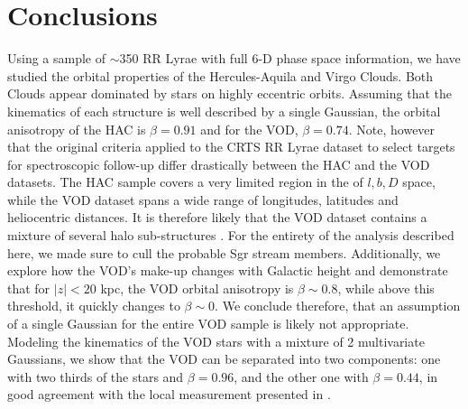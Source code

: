 \documentclass[fleqn,usenatbib]{mnras}
\begin{document}
\section{Conclusions}
%
Using a sample of $\sim$350 RR Lyrae with full 6-D phase space
information, we have studied the orbital properties of the
Hercules-Aquila and Virgo Clouds. Both Clouds appear dominated by
stars on highly eccentric orbits. Assuming that the kinematics of each
structure is well described by a single Gaussian, the orbital
anisotropy of the HAC is $\beta=0.91$ and for the VOD,
$\beta=0.74$. Note, however that the original criteria applied to the
CRTS RR Lyrae dataset to select targets for spectroscopic follow-up
differ drastically between the HAC and the VOD datasets. The HAC
sample covers a very limited region in the of $l,b, D$ space, while
the VOD dataset spans a wide range of longitudes, latitudes and
heliocentric distances. It is therefore likely that the VOD dataset
contains a mixture of several halo sub-structures \citep[see][for a
  detailed discussion]{Vivas2016}. For the entirety of the analysis
described here, we made sure to cull the probable Sgr stream
members. Additionally, we explore how the VOD's make-up changes with
Galactic height and demonstrate that for $|z|<20$ kpc, the VOD orbital
anisotropy is $\beta\sim 0.8$, while above this threshold, it quickly
changes to $\beta\sim0$. We conclude therefore, that an assumption of
a single Gaussian for the entire VOD sample is likely not
appropriate. Modeling the kinematics of the VOD stars with a mixture
of 2 multivariate Gaussians, we show that the VOD can be separated into 
two components: one with two thirds of the stars and $\beta=0.96$, and the 
 other one with $\beta=0.44$, in good agreement 
with the local measurement presented
in \citet{Belokurov2018}.
\end{document}
